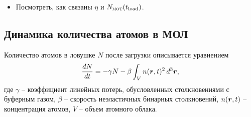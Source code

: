 \begin{itemize}
    \item Посмотреть, как связаны $\eta$ и $\sub{N}{\scalebox{0.75}{MOT}}(\sub{t}{load})$.
\end{itemize}


\subsection*{Динамика количества атомов в МОЛ}

Количество атомов в ловушке $N$ после загрузки описывается уравнением \cite{vlad}
\begin{equation*}
	\frac{d N}{d t} = - \gamma N - \beta \int_V n(\boldsymbol{r}, t)^2 \, d^3 \boldsymbol{r},
\end{equation*}
где $\gamma$ -- коэффициент линейных потерь, обусловленных столкновениями с буферным газом, $\beta$ -- скорость неэластичных бинарных столкновений, $n(\boldsymbol{r}, t)$ -- концентрация атомов, $V$ -- объем атомного облака. 



